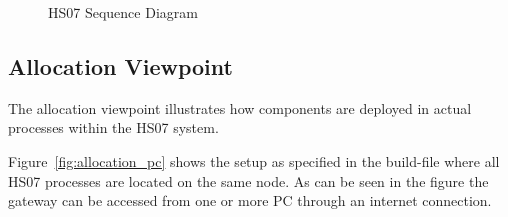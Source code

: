 \documentclass[a4paper,10pt]{article}
\begin{document}
\begin{figure}[!htb]
\caption{HS07 Sequence Diagram}
\label{fig:sequence}
\end{figure}


\subsection{Allocation Viewpoint}

The allocation viewpoint illustrates how components are deployed in actual
processes within the HS07 system. 

Figure~\ref{fig:allocation_pc} shows the setup as specified in the build-file
where all HS07 processes are located on the same node. As can be seen in the
figure the gateway can be accessed from one or more PC through an internet
connection.
\end{document}
